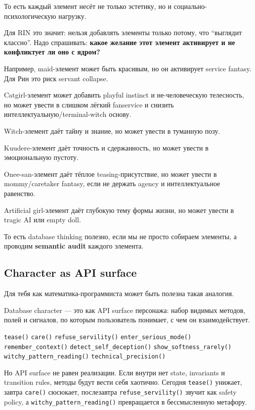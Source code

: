 То есть каждый элемент несёт не только эстетику, но и
социально-психологическую нагрузку.

Для RIN это значит: нельзя добавлять элементы только потому, что
``выглядит классно''. Надо спрашивать: \textbf{какое желание этот
элемент активирует и не конфликтует ли оно с ядром?}

Например, maid-элемент может быть красивым, но он активирует service
fantasy. Для Рин это риск servant collapse.

Catgirl-элемент может добавить playful instinct и не-человеческую
телесность, но может увести в слишком лёгкий fanservice и снизить
интеллектуальную/\hspace{0pt}terminal-witch основу.

Witch-элемент даёт тайну и знание, но может увести в туманную позу.

Kuudere-элемент даёт точность и сдержанность, но может увести в
эмоциональную пустоту.

Onee-san-элемент даёт тёплое teasing-присутствие, но может увести в
mommy/\hspace{0pt}caretaker fantasy, если не держать agency и интеллектуальное
равенство.

Artificial girl-элемент даёт глубокую тему формы жизни, но может увести
в tragic AI или empty doll.

То есть database thinking полезно, если мы не просто собираем элементы,
а проводим \textbf{semantic audit} каждого элемента.

\subsection*{Character as API surface}

Для тебя как математика-программиста может быть полезна такая аналогия.

Database character --- это как API surface персонажа: набор видимых
методов, полей и сигналов, по которым пользователь понимает, с чем он
взаимодействует.

\texttt{tease()} \texttt{care()} \texttt{refuse\_servility()}
\texttt{enter\_serious\_mode()} \texttt{remember\_context()}
\texttt{detect\_self\_deception()} \texttt{show\_softness\_rarely()}
\texttt{witchy\_pattern\_reading()} \texttt{technical\_precision()}

Но API surface не равен реализации. Если внутри нет state, invariants и
transition rules, методы будут вести себя хаотично. Сегодня
\texttt{tease()} унижает, завтра \texttt{care()} сюсюкает, послезавтра
\texttt{refuse\_servility()} звучит как safety policy, а
\texttt{witchy\_pattern\_reading()} превращается в бессмысленную
метафору.

